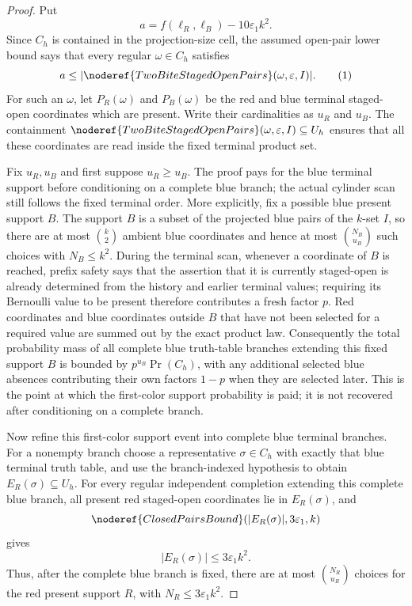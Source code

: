 \begin{proof}
Put
\[
a=f(\ell_R,\ell_B)-10\varepsilon_1k^2.
\]
Since \(C_h\) is contained in the projection-size cell, the assumed open-pair
lower bound says that every regular \(\omega\in C_h\) satisfies
\[
a\le
|\noderef{TwoBiteStagedOpenPairs}(\omega,\varepsilon,I)|. \tag{1}
\]
For such an \(\omega\), let \(P_R(\omega)\) and \(P_B(\omega)\) be the red
and blue terminal staged-open coordinates which are present.  Write their
cardinalities as \(u_R\) and \(u_B\).  The containment
\(\noderef{TwoBiteStagedOpenPairs}(\omega,\varepsilon,I)\subseteq U_h\)
ensures that all these coordinates are read inside the fixed terminal product
set.

Fix \(u_R,u_B\) and first suppose \(u_R\ge u_B\).  The proof pays for the blue
terminal support before conditioning on a complete blue branch; the actual
cylinder scan still follows the fixed terminal order.  More explicitly, fix a
possible blue present support \(B\).  The support \(B\) is a subset of the
projected blue pairs of the \(k\)-set \(I\), so there are at most
\(\binom{k}{2}\) ambient blue coordinates and hence at most
\(\binom{N_B}{u_B}\) such choices with \(N_B\le k^2\).  During the terminal
scan, whenever a coordinate of \(B\) is reached, prefix safety says that the
assertion that it is currently staged-open is already determined from the
history and earlier terminal values; requiring its Bernoulli value to be
present therefore contributes a fresh factor \(p\).  Red coordinates and blue
coordinates outside \(B\) that have not been selected for a required value are
summed out by the exact product law.  Consequently the total probability mass
of all complete blue truth-table branches extending this fixed support \(B\)
is bounded by \(p^{u_B}\Pr(C_h)\), with any additional selected blue absences
contributing their own factors \(1-p\) when they are selected later.  This is
the point at which the first-color support probability is paid; it is not
recovered after conditioning on a complete branch.

Now refine this first-color support event into complete blue terminal
branches.  For a nonempty branch choose a representative
\(\sigma\in C_h\) with exactly that blue terminal truth table, and use the
branch-indexed hypothesis to obtain \(E_R(\sigma)\subseteq U_h\).  For every
regular independent completion extending this complete blue branch, all
present red staged-open coordinates lie in \(E_R(\sigma)\), and
\[
\noderef{ClosedPairsBound}(|E_R(\sigma)|,3\varepsilon_1,k)
\]
gives
\[
|E_R(\sigma)|\le 3\varepsilon_1k^2. \tag{2}
\]
Thus, after the complete blue branch is fixed, there are at most
\(\binom{N_R}{u_R}\) choices for the red present support \(R\), with
\(N_R\le 3\varepsilon_1k^2\).


\end{proof}
